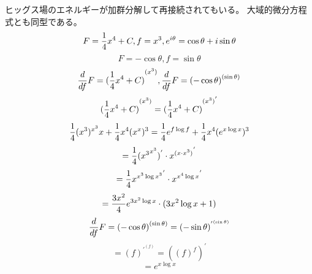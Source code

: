 \documentclass{jsarticle}
\begin{document}
  ヒッグス場のエネルギーが加群分解して再接続されてもいる。
  大域的微分方程式とも同型である。
  $$ F = {1 \over 4}x^4 + C, f = x^3, e^{i \theta} = \cos \theta +
  i \sin \theta $$
  $$ F = - \cos \theta, f = \sin \theta $$
  $$ {d \over df}F = {({1 \over 4}x^4 + C)}^{(x^3)}, 
  {d \over df}F = {(-\cos \theta)}^{(\sin \theta)} $$
  $$ {({1 \over 4}x^4 + C)}^{(x^3)} = {({1 \over 4}x^4 + C)}^{(x^3)^{'}} $$
  $$ {1 \over 4}(x^3)^{x^3} x + {1 \over 4}x^4 (x^x)^3 
  = {1 \over 4}e^{f \log f} + {1 \over 4}x^4 (e^{x \log x})^3 $$
  $$  = {1 \over 4}({{x^3}^{x^3}})^{'} \cdot {x^{(x \cdot x^3)}}^{'}  $$
  $$ = {1 \over 4}{x^{x^3 \log x^3}}^{'} \cdot {x^{x^4 \log x}}^{'} $$
  $$ = {3x^2 \over 4}e^{3x^2 \log x}\cdot (3x^2 \log x + 1) $$
  $$ {d \over df}F = {(-\cos \theta)}^{(\sin \theta)} = 	
   (- \sin \theta)^{{'}^{(\sin \theta)}} $$
  $$ = (f)^{{'}^{(f)}} = {((f)^f)}^{'} $$
  $$ = e^{x \log x} $$
\end{document}
